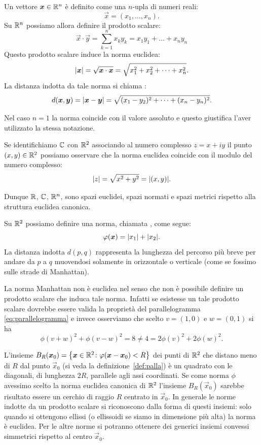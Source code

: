 \begin{definition}
\label{def:124124}
\mymark{*}
Un vettore $\boldsymbol x\in \mathbb R^n$ è definito come una $n$-upla di numeri reali:
\[
  \vec x = (x_1, \dots, x_n).
\]
Su $\mathbb R^n$ possiamo allora definire il prodotto scalare:
\[
  \vec x\cdot \vec y
   = \sum_{k=1}^n x_k y_k
   = x_1 y_1 + \dots + x_n y_n
\]
Questo prodotto scalare induce la norma euclidea:
%
\[
  {\left|\boldsymbol x\right|} = \sqrt{\boldsymbol x \cdot \boldsymbol x}
  = \sqrt{x_1^2 + x_2^2+ \dots + x_n^2}.
\]
La distanza indotta da tale norma si chiama :
\[
  d(\boldsymbol x, \boldsymbol y)
  = {\left|\boldsymbol x-\boldsymbol y\right|}
  = \sqrt{(x_1-y_2)^2 + \dots + (x_n-y_n)^2}.
\]

Nel caso $n=1$ la norma coincide con il valore assoluto e questo
giustifica l'aver utilizzato la stessa notazione.

Se identifichiamo $\mathbb C$ con $\mathbb R^2$ associando al numero complesso $z=x+iy$
il punto $(x,y)\in \mathbb R^2$ possiamo osservare che la norma euclidea
coincide con il modulo del numero complesso:
\[
  {\left|z\right|} = \sqrt{x^2 + y^2} = {\left|(x,y)\right|}.
\]

Dunque $\mathbb R$, $\mathbb C$, $\mathbb R^n$,
sono spazi euclidei, spazi normati e spazi metrici rispetto alla struttura
euclidea canonica.
\end{definition}

\begin{example}
Su $\mathbb R^2$ possiamo definire una norma, chiamata ,
come segue:
\[
  \varphi(\boldsymbol x) = {\left|x_1\right|} + {\left|x_2\right|}.
\]
La distanza indotta $d(p,q)$
%
%
rappresenta la lunghezza del percorso più breve per
andare da $p$ a $q$ muovendosi solamente in orizzontale o verticale
(come se fossimo sulle strade di Manhattan).

La norma Manhattan non è euclidea nel senso che non è possibile definire
un prodotto scalare che induca tale norma. Infatti se esistesse un
tale prodotto scalare dovrebbe essere valida la proprietà del parallelogramma
\eqref{eq:parallelogramma} e invece osserviamo che scelto $v=(1,0)$ e $w=(0,1)$
si ha
\[
  \phi(v+w)^2 + \phi(v-w)^2
  = 8
  \neq 4
  = 2\phi(v)^2 + 2\phi(w)^2.
\]

L'insieme $B_R(\boldsymbol x_0) = {\left\{ \boldsymbol x \in \mathbb R^2\colon \varphi(\boldsymbol x-\boldsymbol x_0) < R \right\}}$
dei punti di $\mathbb R^2$ che distano meno di $R$ dal  punto $\vec x_0$
(si veda la definizione~\ref{def:palla})
è un quadrato
con le diagonali, di lunghezza $2R$, parallele agli assi coordinati.
Se come norma $\phi$ avessimo scelto la norma euclidea canonica di $\mathbb R^2$
l'insieme $B_R(\vec x_0)$ sarebbe risultato essere un cerchio di raggio $R$
centrato in $\vec x_0$.
In generale le norme indotte da un prodotto scalare si riconoscono
dalla forma di questi insiemi: solo quando si ottengono ellissi
(o ellissoidi se siamo in dimensione più alta) la norma è euclidea.
Per le altre norme si potranno ottenere dei generici insiemi convessi simmetrici
rispetto al centro $\vec x_0$.
\end{example}


